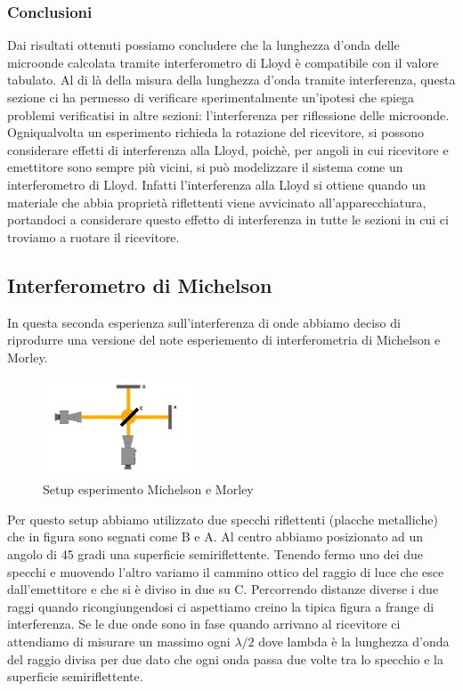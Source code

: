 \documentclass[letterpaper,12pt]{article}
\begin{document}
\subsubsection{Conclusioni}
Dai risultati ottenuti possiamo concludere che la lunghezza d'onda delle microonde calcolata tramite interferometro
di Lloyd è compatibile con il valore tabulato.
Al di là della misura della lunghezza d'onda tramite interferenza, questa sezione ci ha permesso di verificare
sperimentalmente un'ipotesi che spiega problemi verificatisi in altre sezioni: l'interferenza per riflessione 
delle microonde. Ogniqualvolta un esperimento richieda la rotazione del ricevitore, si possono considerare effetti 
di interferenza alla Lloyd, poichè, per angoli in cui ricevitore e emettitore sono sempre più vicini, 
si può modelizzare il sistema come un interferometro di Lloyd. Infatti l'interferenza alla Lloyd si ottiene 
quando un materiale che abbia proprietà riflettenti viene avvicinato all'apparecchiatura, portandoci a 
considerare questo effetto di interferenza in tutte le sezioni in cui ci troviamo a ruotare il ricevitore.\\

\subsection{Interferometro di Michelson}
In questa seconda esperienza sull'interferenza di onde abbiamo deciso di riprodurre una versione del note esperiemento di 
interferometria di Michelson e Morley.
\begin{figure}[h!]
	\centering
	\includegraphics[width = 0.4\textwidth]{MichelsonSetup.png}
	\caption{Setup esperimento Michelson e Morley}
	\label{fig:GraficoBragg}
\end{figure}
Per questo setup abbiamo utilizzato due specchi riflettenti (placche metalliche)
che in figura sono segnati come B e A. Al centro abbiamo posizionato ad un angolo di 45 gradi una superficie semiriflettente.
Tenendo fermo uno dei due specchi e muovendo l'altro variamo il cammino ottico del raggio di luce che esce dall'emettitore e che si è diviso in due su C.
Percorrendo distanze diverse i due raggi quando ricongiungendosi ci aspettiamo creino la tipica figura a frange di interferenza.  
Se le due onde sono in fase quando arrivano al ricevitore ci attendiamo di misurare un massimo ogni $\lambda/2$ dove lambda è la lunghezza d'onda del raggio divisa per due dato che 
ogni onda passa due volte tra lo specchio e la superficie semiriflettente.
\end{document}
